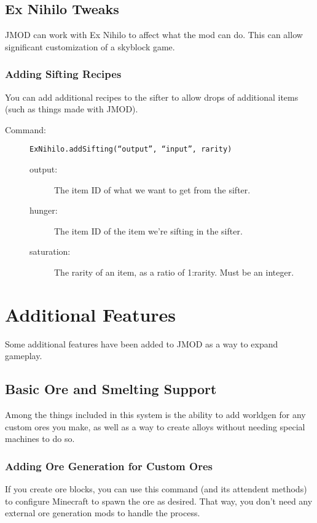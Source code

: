 \documentclass[letterpaper,titlepage,12pt]{article}
\begin{document}
\begin{description}
\subsection{Ex Nihilo Tweaks}

JMOD can work with Ex Nihilo to affect what the mod can do.  This can allow significant customization of a skyblock game.

\subsubsection{Adding Sifting Recipes}

You can add additional recipes to the sifter to allow drops of additional items (such as things made with JMOD).

\begin{description}
\item[Command:] \texttt{ExNihilo.addSifting(``output'', ``input'', rarity)}
\begin{description}
\item [output:] The item ID of what we want to get from the sifter.
\item [hunger:] The item ID of the item we're sifting in the sifter.
\item [saturation:] The rarity of an item, as a ratio of 1:rarity.  Must be an integer.
\end{description}
\end{description}

\section{Additional Features}

Some additional features have been added to JMOD as a way to expand gameplay.

\subsection{Basic Ore and Smelting Support}

Among the things included in this system is the ability to add worldgen for any custom ores you make, as well as a way to create alloys without needing special machines to do so.

\subsubsection{Adding Ore Generation for Custom Ores}

If you create ore blocks, you can use this command (and its attendent methods) to configure Minecraft to spawn the ore as desired.  That way, you don't need any external ore generation mods to handle the process.


\end{description}
\end{document}
